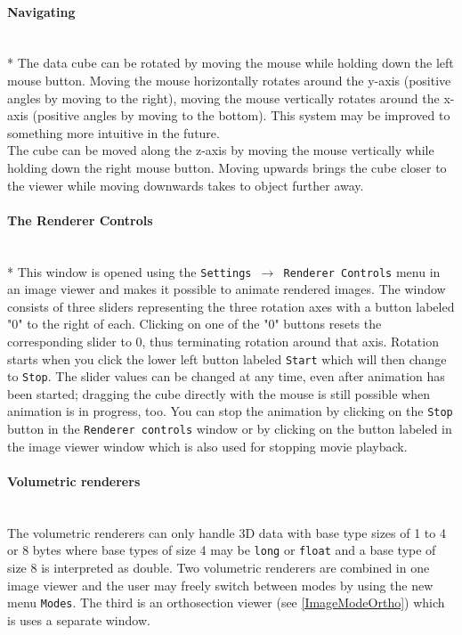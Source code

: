 \documentclass[11pt]{article}
\begin{document}
\paragraph{Navigating} \label{RenderNavigation}
\ \\*
The data cube can be rotated by moving the mouse while holding down the left
mouse button. Moving the mouse horizontally rotates around the y-axis (positive
angles by moving to the right), moving the mouse vertically rotates around the
x-axis (positive angles by moving to the bottom). This system may be improved
to something more intuitive in the future.\\
The cube can be moved along the z-axis by moving the mouse vertically while
holding down the right mouse button. Moving upwards brings the cube closer
to the viewer while moving downwards takes to object further away.

\paragraph{The Renderer Controls} \label{RendererControls}
\ \\*
This window is opened using the \texttt{Settings $\rightarrow$ Renderer Controls} menu
in an image viewer and makes it possible
to animate rendered images. The window consists of three sliders representing the
three rotation axes with a button labeled "0" to the right of each. Clicking on one of
the "0" buttons resets the corresponding slider to 0, thus terminating rotation around
that axis. Rotation starts when you click the lower left button labeled \texttt{Start} which
will then change to \texttt{Stop}. The slider values can be changed at any time, even
after animation has been started; dragging the cube directly with the mouse is
still possible when animation is in progress, too. You can stop the animation by clicking
on the \texttt{Stop} button in the \texttt{Renderer controls} window or by clicking on the
button labeled \texttt{\lbrack \rbrack} in the image viewer window which is also used
for stopping movie playback.

\paragraph{Volumetric renderers} \label{ImageModeVolumetric}
\ \\
The volumetric renderers can only handle 3D data with base type sizes of 1 to 4 or
8 bytes where base types of size 4 may be \texttt{long} or \texttt{float} and a base type
of size 8 is interpreted as double. Two volumetric renderers are combined in
one image viewer and the user may freely switch between modes by using the new
menu \texttt{Modes}. The third is an orthosection viewer (see \ref{ImageModeOrtho})
which is uses a separate window.
\end{document}

